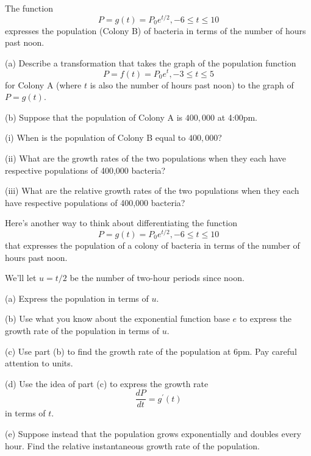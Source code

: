 \documentclass{ximera}
\begin{document}
\begin{question}  \label{Qcgt4ghggyt4r}
The function
\[
     P = g(t) = P_0 e^{t/2}, -6 \leq t \leq 10
\]
expresses the population (Colony B) of bacteria in terms of the number of hours past noon.

(a) Describe a transformation that takes the graph of the population function 
\[
           P = f(t) = P_0 e^t , -3\leq t \leq 5 
\]
for Colony A (where $t$ is also the number of hours past noon) to the graph of $P=g(t)$.

(b) Suppose that the population of Colony A is $400,000$ at 4:00pm.

(i) When is the population of Colony B equal to $400,000$?

(ii) What are the growth rates of the two populations when they each have respective populations of 400,000 bacteria?

(iii) What are the relative growth rates of the two populations when they each have respective populations of 400,000 bacteria?

\end{question}

\begin{question} \label{Q34324gbe43}
Here's another way to think about differentiating the function
\[
      P = g(t) = P_0 e^{t/2} , -6 \leq t \leq 10
\]
that expresses the population of a colony of bacteria in terms of the number of hours past noon.

We'll let $u=t/2$ be the number of two-hour periods since noon. 

(a) Express the population in terms of $u$.

(b) Use what you know about the exponential function base $e$ to express the growth rate of the population in terms of $u$.

(c) Use part (b) to find the growth rate of the population at 6pm. Pay careful attention to units.

(d) Use the idea of part (c) to express the growth rate
\[
    \frac{dP}{dt} = g^\prime(t)
\]
in terms of $t$.

(e) Suppose instead that the population grows exponentially and doubles every hour. Find the relative instantaneous growth rate of the population.

\end{question}
\end{document}
